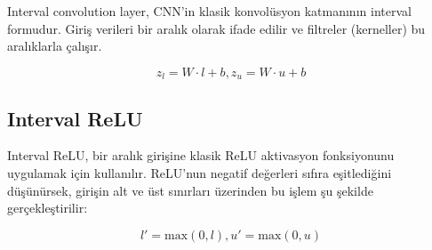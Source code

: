 Interval convolution layer, CNN'in klasik konvolüsyon katmanının interval formudur. Giriş verileri bir aralık olarak ifade edilir ve filtreler (kerneller) bu aralıklarla çalışır.

\[ z_l = W \cdot l + b, z_u = W \cdot u + b \]

\subsection{Interval ReLU}

Interval ReLU, bir aralık girişine klasik ReLU aktivasyon fonksiyonunu uygulamak için kullanılır. ReLU'nun negatif değerleri sıfıra eşitlediğini düşünürsek, girişin alt ve üst sınırları üzerinden bu işlem şu şekilde gerçekleştirilir:

\[ l' = \text{max}(0, l), u' = \text{max}(0, u) \]

\newpage